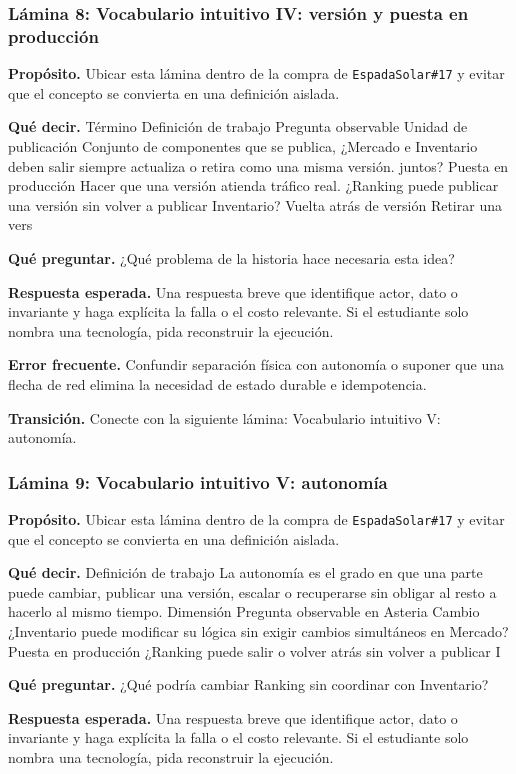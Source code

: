 \documentclass[variant=docente,cover=institutional,mode=screen]{ua-engineering-v6-article}
\begin{document}
\subsubsection*{Lámina 8: Vocabulario intuitivo IV: versión y puesta en producción}
\textbf{Propósito.} Ubicar esta lámina dentro de la compra de \texttt{EspadaSolar\#17} y evitar que el concepto se convierta en una definición aislada.

\textbf{Qué decir.} Término Definición de trabajo Pregunta observable Unidad de publicación Conjunto de componentes que se publica, ¿Mercado e Inventario deben salir siempre actualiza o retira como una misma versión. juntos? Puesta en producción Hacer que una versión atienda tráfico real. ¿Ranking puede publicar una versión sin volver a publicar Inventario? Vuelta atrás de versión Retirar una vers

\textbf{Qué preguntar.} ¿Qué problema de la historia hace necesaria esta idea?

\textbf{Respuesta esperada.} Una respuesta breve que identifique actor, dato o invariante y haga explícita la falla o el costo relevante. Si el estudiante solo nombra una tecnología, pida reconstruir la ejecución.

\textbf{Error frecuente.} Confundir separación física con autonomía o suponer que una flecha de red elimina la necesidad de estado durable e idempotencia.

\textbf{Transición.} Conecte con la siguiente lámina: Vocabulario intuitivo V: autonomía.

\subsubsection*{Lámina 9: Vocabulario intuitivo V: autonomía}
\textbf{Propósito.} Ubicar esta lámina dentro de la compra de \texttt{EspadaSolar\#17} y evitar que el concepto se convierta en una definición aislada.

\textbf{Qué decir.} Definición de trabajo La autonomía es el grado en que una parte puede cambiar, publicar una versión, escalar o recuperarse sin obligar al resto a hacerlo al mismo tiempo. Dimensión Pregunta observable en Asteria Cambio ¿Inventario puede modificar su lógica sin exigir cambios simultáneos en Mercado? Puesta en producción ¿Ranking puede salir o volver atrás sin volver a publicar I

\textbf{Qué preguntar.} ¿Qué podría cambiar Ranking sin coordinar con Inventario?

\textbf{Respuesta esperada.} Una respuesta breve que identifique actor, dato o invariante y haga explícita la falla o el costo relevante. Si el estudiante solo nombra una tecnología, pida reconstruir la ejecución.
\end{document}
